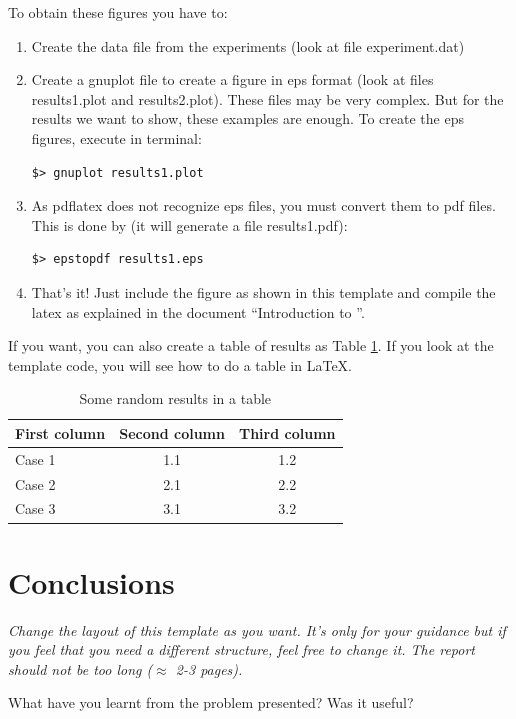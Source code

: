 \documentclass[a4paper, 11pt]{article}
\begin{document}
To obtain these figures you have to:
\begin{enumerate}

\item Create the data file from the experiments (look at file
  experiment.dat)

\item Create a gnuplot file to create a figure in eps format (look at
  files results1.plot and results2.plot). These files may be very
  complex. But for the results we want to show, these examples are
  enough. To create the eps figures, execute in terminal:

\begin{verbatim}
$> gnuplot results1.plot 
\end{verbatim}

\item As pdflatex does not recognize eps files, you must convert them
  to pdf files. This is done by (it will generate a file
  results1.pdf):

\begin{verbatim}
$> epstopdf results1.eps
\end{verbatim}

\item That's it! Just include the figure as shown in this template and
  compile the latex as explained in the document ``Introduction to
  \LaTeXe''.

\end{enumerate}


If you want, you can also create a table of results as Table
\ref{tab:results}. If you look at the template code, you will see how
to do a table in \LaTeX.

\begin{table}[h]
\centering
\begin{tabular}{lcc}
First column & Second column & Third column\\\hline
Case 1 & 1.1 & 1.2\\\hline
Case 2 & 2.1 & 2.2\\\hline
Case 3 & 3.1 & 3.2\\\hline
\end{tabular}
\caption{Some random results in a table}
\label{tab:results}
\end{table}

\section{Conclusions}

\textit{Change the layout of this template as you want. It's only for
  your guidance but if you feel that you need a different structure,
  feel free to change it. The report should not be too long ($\approx$
  2-3 pages).}

What have you learnt from the problem presented?
Was it useful?
\end{document}
